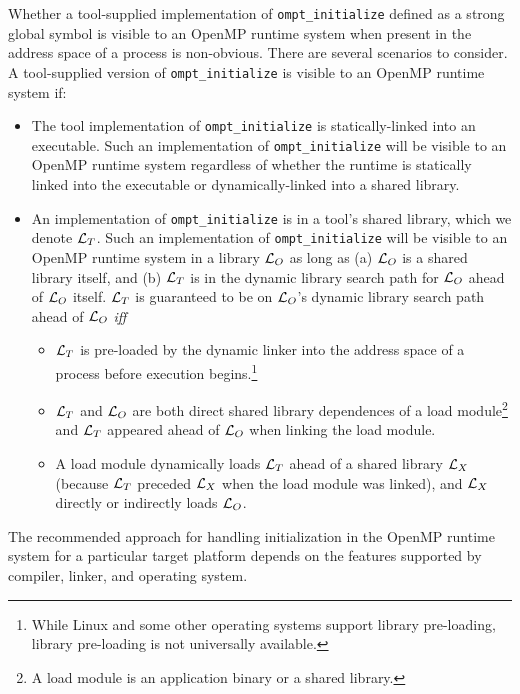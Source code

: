\documentclass{article}
\begin{document}
Whether a tool-supplied implementation of  \verb|ompt_initialize| defined as a strong global symbol is visible to an OpenMP runtime system when present in the address space of a process is non-obvious. There are several scenarios to consider.
A tool-supplied version of \verb|ompt_initialize|  is visible to an OpenMP runtime system if:
\begin{itemize}
\item The tool implementation of  \verb|ompt_initialize| is statically-linked into an executable. Such an implementation of  \verb|ompt_initialize| will  be visible to an OpenMP runtime system regardless of whether the runtime is statically linked into the executable or dynamically-linked into a shared library. 
\item An implementation of  \verb|ompt_initialize|  is in a tool's shared library, which we denote ${\cal L}_T$. Such an implementation of  \verb|ompt_initialize| will  be visible to an OpenMP runtime system in a library ${\cal L}_O$ as long as (a) ${\cal L}_O$ is a shared library itself, and (b) ${\cal L}_T$ is in the dynamic library search path for ${\cal L}_O$ ahead of ${\cal L}_O$  itself. ${\cal L}_T$ is guaranteed to be on ${\cal L}_O$'s dynamic library search path ahead of ${\cal L}_O$ {\em iff}
\begin{itemize}
\item ${\cal L}_T$ is pre-loaded by the dynamic linker into the address space of a process before execution begins.\footnote{While Linux and some other operating systems support library pre-loading, library pre-loading is not universally available.}
\item ${\cal L}_T$ and ${\cal L}_O$ are both direct shared library dependences of a load module\footnote{A load module is an application binary or a  shared library.}  and ${\cal L}_T$ appeared ahead of ${\cal L}_O$ when linking the load module.
\item A load module dynamically loads ${\cal L}_T$  ahead of a shared library ${\cal L}_X$ (because ${\cal L}_T$  preceded ${\cal L}_X$ when the load module was linked), and  ${\cal L}_X$ directly or indirectly loads ${\cal L}_O$.
\end{itemize}
\end{itemize}

The recommended approach for handling initialization in the OpenMP runtime system for a particular target platform depends on the features supported by  compiler, linker, and operating system.
\end{document}
